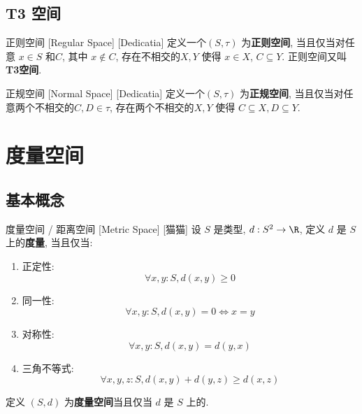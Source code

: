 \documentclass[UTF8]{ctexart}
\begin{document}
        \subsection{T3 空间}

            \begin{dfn}
                {正则空间}
                [Regular Space]
                [Dedicatia]
                定义一个 $(S,\tau)$ 为\textbf{正则空间}, 当且仅当对任意 $x\in S$ 和 $C$, 其中 $x\notin C$, 存在不相交的 $X,Y$ 使得 $x\in X$, $C\subseteq Y$. 
                正则空间又叫\textbf{T3空间}.
            \end{dfn}

            \begin{dfn}
                {正规空间}
                [Normal Space]
                [Dedicatia]
                定义一个 $(S,\tau)$ 为\textbf{正规空间}, 当且仅当对任意两个不相交的 $C,D\in\tau$, 存在两个不相交的 $X,Y$ 使得 $C\subseteq X, D\subseteq Y$.
            \end{dfn}

    \section{度量空间}
        
        \subsection{基本概念}
            
            \begin{dfn}
                {度量空间 / 距离空间}
                [Metric Space]
                [猫猫]
                设 \(S\) 是类型, \(d:S^2\to\R\), 定义 \(d\) 是 \(S\) 上的\textbf{度量}, 当且仅当: 
                \begin{enumerate}
                    \item 正定性: 
                    \[\forall x,y:S, d(x,y)\geq 0\]

                    \item 同一性: 
                    \[\forall x,y:S, d(x,y)=0\iff x=y\]
    
                    \item 对称性: 
                    \[\forall x,y:S, d(x,y)=d(y,x)\]
    
                    \item 三角不等式: 
                    \[\forall x,y,z:S, d(x,y)+d(y,z)\geq d(x,z)\]
                \end{enumerate}

                定义 \((S,d)\) 为\textbf{度量空间}当且仅当 \(d\) 是 \(S\) 上的. 
            \end{dfn}
\end{document}
